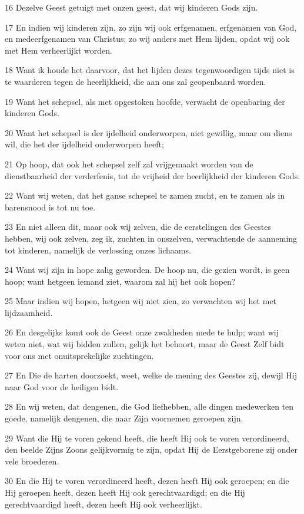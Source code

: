 \par 16 Dezelve Geest getuigt met onzen geest, dat wij kinderen Gods zijn.
\par 17 En indien wij kinderen zijn, zo zijn wij ook erfgenamen, erfgenamen van God, en medeerfgenamen van Christus; zo wij anders met Hem lijden, opdat wij ook met Hem verheerlijkt worden.
\par 18 Want ik houde het daarvoor, dat het lijden dezes tegenwoordigen tijds niet is te waarderen tegen de heerlijkheid, die aan ons zal geopenbaard worden.
\par 19 Want het schepsel, als met opgestoken hoofde, verwacht de openbaring der kinderen Gods.
\par 20 Want het schepsel is der ijdelheid onderworpen, niet gewillig, maar om diens wil, die het der ijdelheid onderworpen heeft;
\par 21 Op hoop, dat ook het schepsel zelf zal vrijgemaakt worden van de dienstbaarheid der verderfenis, tot de vrijheid der heerlijkheid der kinderen Gods.
\par 22 Want wij weten, dat het ganse schepsel te zamen zucht, en te zamen als in barensnood is tot nu toe.
\par 23 En niet alleen dit, maar ook wij zelven, die de eerstelingen des Geestes hebben, wij ook zelven, zeg ik, zuchten in onszelven, verwachtende de aanneming tot kinderen, namelijk de verlossing onzes lichaams.
\par 24 Want wij zijn in hope zalig geworden. De hoop nu, die gezien wordt, is geen hoop; want hetgeen iemand ziet, waarom zal hij het ook hopen?
\par 25 Maar indien wij hopen, hetgeen wij niet zien, zo verwachten wij het met lijdzaamheid.
\par 26 En desgelijks komt ook de Geest onze zwakheden mede te hulp; want wij weten niet, wat wij bidden zullen, gelijk het behoort, maar de Geest Zelf bidt voor ons met onuitsprekelijke zuchtingen.
\par 27 En Die de harten doorzoekt, weet, welke de mening des Geestes zij, dewijl Hij naar God voor de heiligen bidt.
\par 28 En wij weten, dat dengenen, die God liefhebben, alle dingen medewerken ten goede, namelijk dengenen, die naar Zijn voornemen geroepen zijn.
\par 29 Want die Hij te voren gekend heeft, die heeft Hij ook te voren verordineerd, den beelde Zijns Zoons gelijkvormig te zijn, opdat Hij de Eerstgeborene zij onder vele broederen.
\par 30 En die Hij te voren verordineerd heeft, dezen heeft Hij ook geroepen; en die Hij geroepen heeft, dezen heeft Hij ook gerechtvaardigd; en die Hij gerechtvaardigd heeft, dezen heeft Hij ook verheerlijkt.

